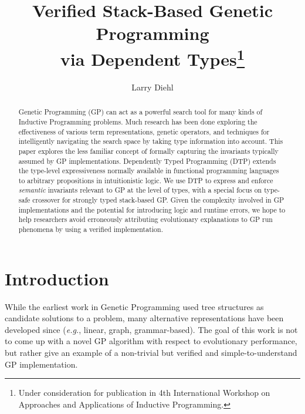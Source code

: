 \documentclass[runningheads,a4paper]{llncs}
\begin{document}
\mainmatter  %

\title{Verified Stack-Based Genetic Programming\\
via Dependent Types\thanks{Under consideration for publication in
  4th International Workshop on Approaches and Applications of
  Inductive Programming.}}

\author{Larry Diehl}

\maketitle
\begin{abstract}
Genetic Programming (GP) can act as a powerful search tool for many
kinds of Inductive Programming problems. Much research has been done exploring the
effectiveness of various term representations, genetic operators, and
techniques for intelligently navigating the search space by taking
type information into account. This paper explores the less familiar
concept of formally capturing the invariants typically assumed by GP
implementations. Dependently Typed Programming (DTP) extends the
type-level expressiveness normally available in functional programming
languages to arbitrary propositions in intuitionistic logic. We use
DTP to express and enforce \textit{semantic} invariants relevant to GP
at the level of types, with a special focus on type-safe crossover for
strongly typed stack-based GP. Given the complexity involved in GP
implementations and the potential for introducing logic and runtime errors, we hope to help
researchers avoid erroneously attributing evolutionary explanations
to GP run phenomena by using a verified implementation. 
\end{abstract}

\section{Introduction}

While the earliest work in Genetic Programming used tree structures as
candidate solutions to a problem, many alternative representations
have been developed since (\textit{e.g.}, linear, graph, grammar-based). The
goal of this work is not to come up with a novel GP algorithm with
respect to evolutionary performance, but rather give an example of a
non-trivial but verified and simple-to-understand GP implementation.
\end{document}
